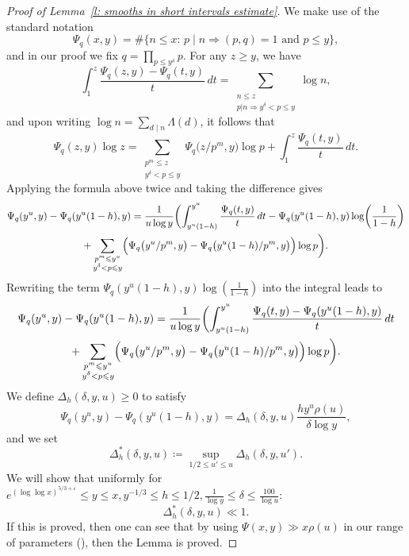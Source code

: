 \documentclass[12pt,a4paper,reqno]{amsart}
\numberwithin{equation}{section}
\def\leq {\leqslant}
\theoremstyle{remark}
\theoremstyle{definition}
\numberwithin{equation}{section}
\theoremstyle{remark}
\begin{document}
\begin{proof}[Proof of Lemma~\ref{l: smooths in short intervals estimate}]
We make use of the standard notation \[\Psi_q (x,y) = \# \{ n \leq x : \, p \mid n \Rightarrow (p,q) = 1 \text{ and } p \leq y \},\] 
and in our proof we fix $q = \prod_{p \leq y^\delta} p$. For any $z \geq y$, we have
\[
\int_1^z \frac{\Psi_q (z,y) - \Psi_q (t,y)}{t} \, dt = \sum_{\substack{n \leq z \\ p|n \Rightarrow y^{\delta} < p \leq y}} \log n ,
\]
and upon writing $\log n = \sum_{d \mid n} \Lambda(d)$, it follows that
\[
\Psi_q (z,y) \log z = \sum_{\substack{p^m \leq z \\ y^\delta < p \leq y}} \Psi_q \bigl( z/p^m , y ) \log p + \int_1^z \frac{\Psi_q (t,y)}{t} \, dt .
\]
Applying the formula above twice and taking the difference gives
\begin{multline*}
\Psi_q (y^u, y) - \Psi_q (y^u (1-h), y) = \frac{1}{u \log y} \biggl( \int_{y^u (1-h)}^{y^u} \frac{\Psi_q (t,y)}{t} \, dt - \Psi_q (y^u (1-h),y) \log \biggl( \frac{1}{1-h} \biggr) \\
+ \sum_{\substack{p^m \leq y^u \\ y^{\delta} < p \leq y}} \Bigl( \Psi_q \bigl( y^u/p^m , y \bigr) - \Psi_q \bigl( y^u (1-h)/p^m, y \bigr) \Bigr) \log p \biggr) .
\end{multline*}
Rewriting the term $\Psi_q (y^u (1-h),y) \log ( \frac{1}{1-h} )$ into the integral leads to
\begin{multline}\label{equ:smooths short int}
\Psi_q (y^u, y) - \Psi_q (y^u (1-h), y) = \frac{1}{u \log y} \biggl( \int_{y^u (1-h)}^{y^u} \frac{\Psi_q (t,y) - \Psi_q (y^u (1-h),y)}{t} \, dt \\
+ \sum_{\substack{p^m \leq y^u \\ y^{\delta} < p \leq y}} \Bigl( \Psi_q \bigl( y^u/p^m , y \bigr) - \Psi_q \bigl( y^u (1-h)/p^m, y \bigr) \Bigr) \log p \biggr) .
\end{multline}
We define $\Delta_h (\delta, y, u) \geq 0$ to satisfy
\[
\Psi_q (y^u, y) - \Psi_q (y^u (1-h), y) = \Delta_h (\delta, y, u)  \frac{h y^u \rho(u)}{\delta \log y} ,    
\]
and we set
\[
\Delta_h^* (\delta, y, u) \coloneqq \sup_{1/2 \leq u' \leq u} \Delta_h (\delta, y, u') .
\]
We will show that uniformly for $ e^{(\log \log x)^{5/3 + \varepsilon}} \leq y \leq x, y^{-1/3} \leq h \leq 1/2, \frac{1}{\log y} \leq \delta \leq \frac{100}{\log u}$: 
\begin{equation}\label{equ: final}
    \Delta_h^* (\delta, y, u) \ll 1.
\end{equation}
If this is proved, then one can see that by using $\Psi(x, y)\gg x\rho(u)$ in our range of parameters (\cite{Hensley1985}), then the Lemma is proved. 


\end{proof}
\end{document}

